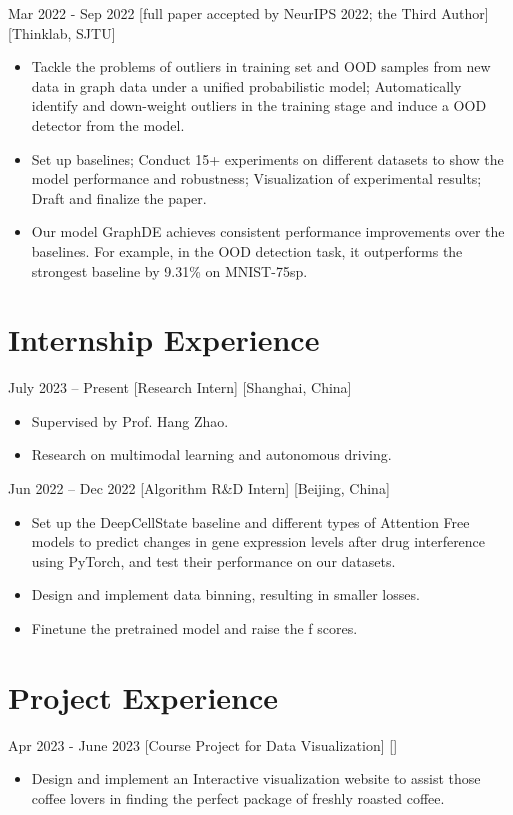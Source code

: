\documentclass{chicv}
\begin{document}
{Mar 2022 - Sep 2022}
[full paper accepted by NeurIPS 2022; the Third Author]
[Thinklab, SJTU]

\begin{itemize}
	\item Tackle the problems of outliers in training set and OOD samples from new data in graph data under a unified probabilistic model; Automatically identify and down-weight outliers in the training stage and induce a OOD detector from the model.
	\item Set up baselines; Conduct 15+ experiments on different datasets to show the model performance and robustness; Visualization of experimental results; Draft and finalize the paper.
	\item Our model GraphDE achieves consistent performance improvements over the baselines. For example, in the OOD detection task, it outperforms the strongest baseline by 9.31\% on MNIST-75sp.
\end{itemize}

\section{Internship Experience}
{July 2023 – Present}
[Research Intern]
[Shanghai, China]

\begin{itemize}
	\item Supervised by Prof. Hang Zhao.
	\item Research on multimodal learning and autonomous driving.
\end{itemize}

{Jun 2022 – Dec 2022}
[Algorithm R\&D Intern]
[Beijing, China]

\begin{itemize}
	\item Set up the DeepCellState baseline and different types of Attention Free models  to predict changes in gene expression levels after drug interference using PyTorch, and test their performance on our datasets.
	\item Design and implement data binning, resulting in smaller losses.
	\item Finetune the pretrained model and raise the f scores.
\end{itemize}

\section{Project Experience}
  {Apr 2023 - June 2023}
  [Course Project for Data Visualization]
  []
\begin{itemize}
	\item Design and implement an Interactive visualization website to assist those coffee lovers in finding the perfect package of freshly roasted coffee.
\end{itemize}
\end{document}
